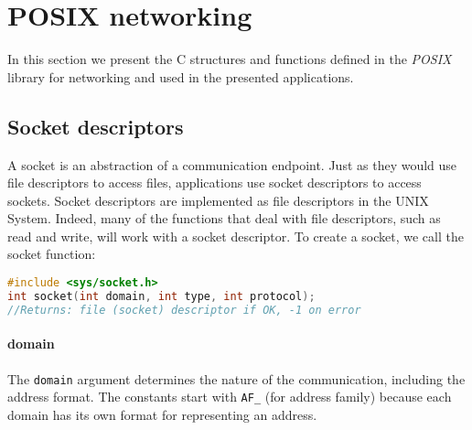\documentclass[12pt, letterpaper]{article}
\theoremstyle{definition}
\let\ti\textit
\let\tb\textbf
\let\cd\lstinline
\begin{document}
\section{POSIX networking}

\lstset{escapechar=@,style=customc}

In this section we present the C structures and functions defined in the \ti{POSIX} library for networking and used in the presented applications.

\subsection{Socket descriptors}
A socket is an abstraction of a communication endpoint. Just as they would use file descriptors to access files, applications use socket descriptors to access sockets. Socket descriptors are implemented as file descriptors in the UNIX System. Indeed, many of the functions that deal with file descriptors, such as read and write, will work with a socket descriptor. 
To create a socket, we call the socket function:
\begin{lstlisting}[language=C, ]
#include <sys/socket.h>
int socket(int domain, int type, int protocol);
//Returns: file (socket) descriptor if OK, -1 on error
\end{lstlisting}

\paragraph{\tb{domain}} The \cd+domain+ argument determines the nature of the communication, including the address format. The constants start with \cd+AF_+ (for address family) because each domain has its own format for representing an address.
\end{document}
